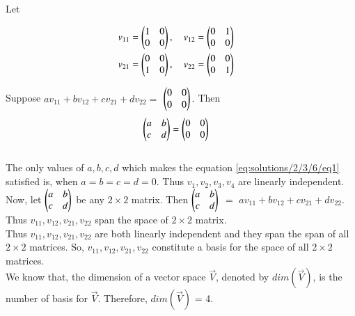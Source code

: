 	
	Let
	
	\begin{align}
		v_{11} = \begin{pmatrix}
			1 & 0 \\
			0 & 0 \\
		\end{pmatrix},
		\quad 
		v_{12} = \begin{pmatrix}
			0 & 1 \\
			0 & 0 \\
		\end{pmatrix}
		\quad \\
		v_{21} = \begin{pmatrix}
			0 & 0 \\
			1 & 0 \\
		\end{pmatrix},
		\quad 
		v_{22} = \begin{pmatrix}
			0 & 0 \\
			0 & 1 \\
		\end{pmatrix}
		\quad
	\end{align}
	
	Suppose $av_{11} + bv_{12} + cv_{21} + dv_{22} = $ $\begin{pmatrix}
		0 & 0 \\
		0 & 0 \\
	\end{pmatrix}.$ Then \\
	
	\begin{align}\label{eq:solutions/2/3/6/eq1}
		\begin{pmatrix}
			a & b \\
			c & d \\
		\end{pmatrix} = 
		\begin{pmatrix}
			0 & 0 \\
			0 & 0 \\
		\end{pmatrix}
		\quad 
	\end{align}\\
	
	The only values of $a, b, c, d$ which makes the equation \eqref{eq:solutions/2/3/6/eq1} satisfied is, when $a=b=c=d=0$. Thus $v_1, v_2, v_3, v_4$ are linearly independent.\\
	
	Now, let $\begin{pmatrix}
		a & b \\
		c & d \\
	\end{pmatrix}$ be any $2\times 2$ matrix. Then $\begin{pmatrix}
		a & b \\
		c & d \\
	\end{pmatrix}$ $=$ $av_{11} + bv_{12} + cv_{21} + dv_{22}.$ Thus $v_{11}, v_{12}, v_{21}, v_{22}$ span the space of $2\times 2$ matrix.\\
	
	Thus $v_{11}, v_{12}, v_{21}, v_{22}$ are both linearly independent and they span the span of all $2\times 2$ matrices. So, $v_{11}, v_{12}, v_{21}, v_{22}$ constitute a basis for the space of all $2\times 2$ matrices. \\
	
	We know that, the dimension of a vector space $\vec{V}$, denoted by $dim(\vec{V})$, is the number of basis for $\vec{V}$. Therefore, $dim(\vec{V})$ = 4.
	
